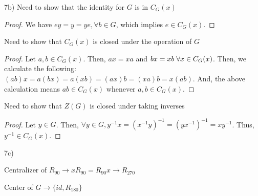 \documentclass[executivepaper]{article}
\begin{document}
\begin{flushleft}

7b) Need to show that the identity for $G$ is in $C_{G}(x)$

\begin{center}

\begin{proof}

We have $ey=y=ye, \forall b \in G$, which implies $e \in C_{G}(x)$.

\end{proof}

\end{center}

Need to show that $C_{G}(x)$ is closed under the operation of $G$

\begin{center}

\begin{proof}

Let $a,b \in C_{G}(x)$. Then, $ax=xa$ and $bx=xb \hspace{1mm} \forall x \in C_{G}(x)$. Then, we calculate the following: $(ab)x=a(bx)=a(xb)=(ax)b=(xa)b=x(ab)$. And, the above calculation means $ab \in C_{G}(x)$ whenever $a,b \in C_{G}(x)$.

\end{proof}

\end{center}

Need to show that $Z(G)$ is closed under taking inverses

\begin{center}

\begin{proof}

Let $y \in G$. Then, $\forall y \in G, y^{-1}x=(x^{-1}y)^{-1}=(yx^{-1})^{-1}=xy^{-1}$. Thus, $y^{-1} \in C_{G}(x)$.

\end{proof}

\end{center}

\end{flushleft}

\pagebreak

\vspace*{-40mm}

\begin{flushleft}

7c) 

\begin{center}

Centralizer of $R_{90} \rightarrow xR_{90}=R_{90}x \rightarrow R_{270}$

\vspace{3mm}

Center of $G \rightarrow \big\{id, R_{180}\big\}$

\end{center}

\end{flushleft}
\end{document}
